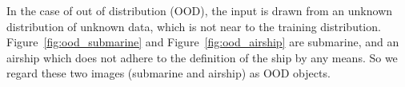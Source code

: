 In the case of out of distribution (OOD), the input is drawn from an unknown distribution of unknown data, which is not near to the training distribution.
Figure~\ref{fig:ood_submarine} and Figure~\ref{fig:ood_airship} are submarine, and an airship which does not adhere to the definition of the ship by any means.
So we regard these two images (submarine and airship) as OOD objects.



